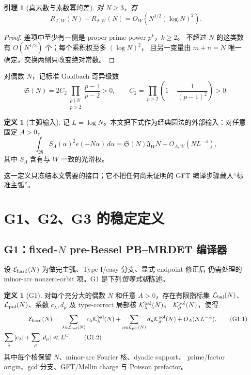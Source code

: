 \documentclass[11pt,a4paper]{ctexart}
\newtheorem{lemma}[theorem]{引理}
\theoremstyle{definition}
\newtheorem{definition}[theorem]{定义}
\newcommand{\LL}{\mathcal L}
\newcommand{\E}{\mathcal E}
\newcommand{\K}{\mathcal K}
\begin{document}
\begin{lemma}[真素数与素数幂的差]
对 $N\ge3$，有
\[
R_{\Lambda,W}(N)-R_{\vartheta,W}(N)
=O_W\!\left(N^{1/2}(\log N)^2\right).
\]
\end{lemma}

\begin{proof}
差项中至少有一侧是 proper prime power $p^k$，$k\ge2$。
不超过 $N$ 的这类数有 $O(N^{1/2})$ 个；每个乘积权至多 $(\log N)^2$，
且另一变量由 $m+n=N$ 唯一确定。交换两侧只改变绝对常数。
\end{proof}

对偶数 $N$，记标准 Goldbach 奇异级数
\[
\mathfrak S(N)=2C_2\prod_{\substack{p\mid N\\p>2}}\frac{p-1}{p-2}>0,
\qquad
C_2=\prod_{p>2}\left(1-\frac1{(p-1)^2}\right)>0.
\]

\begin{definition}[主弧输入]
记 $L=\log N$。本文把下式作为经典圆法的外部输入：对任意固定 $A>0$，
\[
\int_{\mathfrak M}S_\Lambda(\alpha)^2e(-N\alpha)\,d\alpha
=\mathfrak S(N)\mathfrak J_WN+O_{A,W}(NL^{-A}),
\tag{MA}
\]
其中 $S_\Lambda$ 含有与 $W$ 一致的光滑权。
\end{definition}

这一定义只冻结本文需要的接口；它不把任何尚未证明的 GFT 编译步骤藏入“标准主弧”。

\section{G1、G2、G3 的稳定定义}

\subsection{G1：fixed-$N$ pre-Bessel PB--MRDET 编译器}

设 $\E_{\rm hard}(N)$ 为做完主弧、Type-I/easy 分支、显式 endpoint 修正后
仍需处理的 minor-arc nonzero-orbit 项。G1 是下列\emph{恒等式级}陈述。

\begin{definition}[G1]
对每个充分大的偶数 $N$ 和任意 $A>0$，存在有限指标集
$\LL_{\rm bal}(N)$、$\LL_{\rm pol}(N)$、系数 $c_\lambda,d_\mu$ 及
type-correct 局部核 $\K_\lambda^{\rm bal}(N)$、
$\K_\mu^{\rm pol}(N)$，使得
\begin{align}
\E_{\rm hard}(N)
={}&\sum_{\lambda\in\LL_{\rm bal}(N)}c_\lambda
\K_\lambda^{\rm bal}(N)
+\sum_{\mu\in\LL_{\rm pol}(N)}d_\mu
\K_\mu^{\rm pol}(N)
+O_A(NL^{-A}),                                           \tag{G1.1}\\
\sum_\lambda|c_\lambda|+\sum_\mu|d_\mu|
\ll{}& L^{C},                                             \tag{G1.2}
\end{align}
其中每个核保留 $N$、minor-arc Fourier 核、dyadic support、
prime/factor origin、gcd 分支、GFT/Mellin charge 与 Poisson prefactor。
\end{definition}
\end{document}
